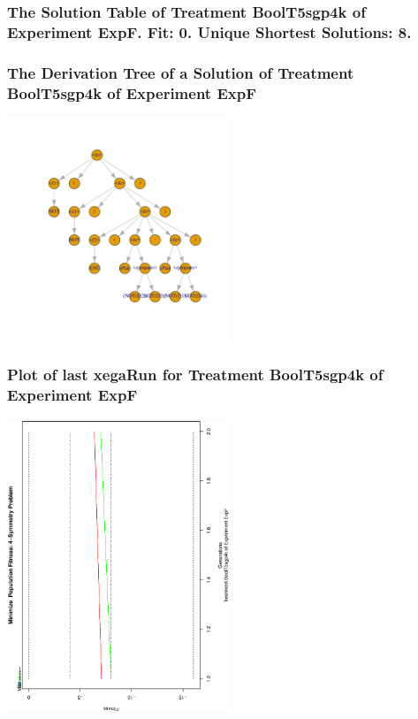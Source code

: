\documentclass[18pt,c]{beamer}
\begin{document}
 \begin{frame}
 \fontsize{8pt}{9pt}\selectfont
 \frametitle{ The Solution Table of Treatment BoolT5sgp4k of Experiment ExpF. Fit: 0. Unique Shortest Solutions: 8. }

 \label{ExpFSolutionTable005.tex}  
 \end{frame}

 \begin{frame}
 \frametitle{ The Derivation Tree of a Solution of Treatment BoolT5sgp4k of Experiment ExpF }
 \begin{center}
\includegraphics[width=0.5\textwidth, angle=0]
{ExpFDerivationTreeFigure005.pdf}
 \end{center}
 \label{report/ExpFDerivationTreeFigure005.pdf}  
 \end{frame}

 \begin{frame}
 \frametitle{ Plot of last xegaRun for Treatment BoolT5sgp4k of Experiment ExpF }
 \begin{center}
\includegraphics[width=0.5\textwidth, angle=-90]
{ExpFPlotPopStatsFigure005.eps}
 \end{center}
 \label{report/ExpFPlotPopStatsFigure005.eps}  
 \end{frame}
\end{document}
